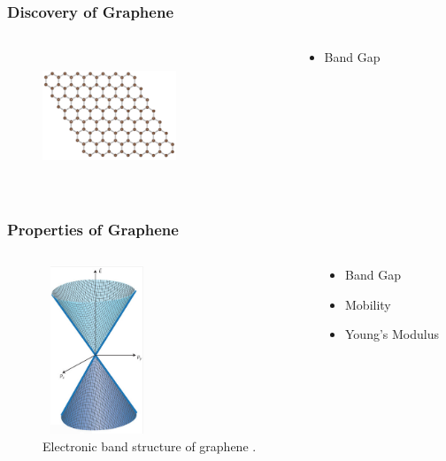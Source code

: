 \documentclass{beamer}
\begin{document}
\begin{frame}
\frametitle{Discovery of Graphene}
\begin{columns}
	\begin{column}{0.48\textwidth}
	\begin{figure}
		\includegraphics[height=4cm, width=4cm]{../present_figs/grapheneSheet}
		\caption{\cite{Fukidome2012}}
	\end{figure}
	\end{column}
	\begin{column}{0.48\textwidth}
		\begin{itemize}
            \item Band Gap
        \end{itemize}
	\end{column}
\end{columns}
\end{frame}

\begin{frame}
\frametitle{Properties of Graphene}
\begin{columns}
	\begin{column}{0.48\textwidth}
	\begin{figure}
		\includegraphics[height=5cm, width=3.25cm]{../present_figs/graphenebandgap}
		\caption{Electronic band structure of graphene \cite{Fuhrer2010}.}
	\end{figure}
	\end{column}
	\begin{column}{0.48\textwidth}
		\begin{itemize}
            \item Band Gap
            \item Mobility
            \item Young's Modulus
        \end{itemize}
	\end{column}
\end{columns}
\end{frame}
\end{document}

